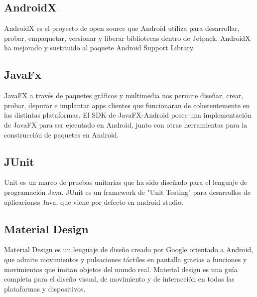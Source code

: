 \subsection{AndroidX}

AndroidX es el proyecto de open source que Android utiliza para desarrollar, probar, empaquetar, versionar y liberar bibliotecas dentro de Jetpack. AndroidX ha mejorado y sustituido al paquete Android Support Library.

\subsection{JavaFx}

JavaFX a través de paquetes gráficos y multimedia nos permite diseñar, crear, probar, depurar e implantar apps clientes que funcionaran de coherentemente en las distintas plataformas. El SDK de JavaFX-Android posee una implementación de JavaFX para ser ejecutado en Android, junto con otras herramientas para la construcción de paquetes en Android.

\subsection{JUnit}

Unit es un marco de pruebas unitarias que ha sido diseñado para el lenguaje de programación Java. JUnit es un framework de "Unit Testing" para desarrollos de aplicaciones Java, que viene por defecto en android studio.

\subsection{Material Design}

Material Design es un lenguaje de diseño creado por Google orientado a Android, que admite movimientos y pulsaciones táctiles en pantalla gracias a funciones y movimientos que imitan objetos del mundo real. Material design es una guía completa para el diseño visual, de movimiento y de interacción en todas las plataformas y dispositivos.



